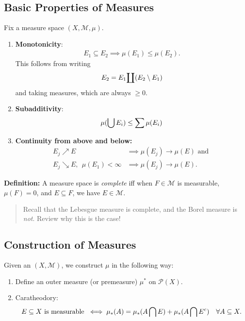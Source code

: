 \hypertarget{basic-properties-of-measures}{%
\subsection{Basic Properties of
Measures}\label{basic-properties-of-measures}}

Fix a measure space \((X, \mathcal M, \mu)\).

\begin{enumerate}
\def\labelenumi{\arabic{enumi}.}
\item
  \textbf{Monotonicity}:
  \begin{align*}
  E_1 \subseteq E_2 \implies \mu(E_1) \leq \mu(E_2)
  .\end{align*} This follows from writing
  \begin{align*}
    E_2 = E_1 {\coprod} (E_2 \setminus E_1)
    \end{align*} and taking measures, which are always \(\geq 0\).
\item
  \textbf{Subadditivity}:
  \begin{align*}
  \mu(\bigcup E_i) \leq \sum \mu(E_i)
  \end{align*}
\item
  \textbf{Continuity from above and below:} \begin{align*}
  E_j \nearrow E &\implies \mu(E_j) \to \mu(E) \text{ and }  \\ E_j \searrow E, ~~\mu(E_1) < \infty &\implies \mu(E_j) \to \mu(E)
  .\end{align*}
\end{enumerate}

\textbf{Definition:} A measure space is \emph{complete} iff when
\(F \in \mathcal M\) is measurable, \(\mu(F) = 0\), and
\(E\subseteq F\), we have \(E \in \mathcal M\).

\begin{quote}
Recall that the Lebesgue measure is complete, and the Borel measure is
\emph{not}. Review why this is the case!
\end{quote}

\hypertarget{construction-of-measures}{%
\subsection{Construction of Measures}\label{construction-of-measures}}

Given an \((X, \mathcal M)\), we construct \(\mu\) in the following way:

\begin{enumerate}
\def\labelenumi{\arabic{enumi}.}
\tightlist
\item
  Define an outer measure (or premeasure) \(\mu^*\) on
  \(\mathcal P(X)\).
\item
  Caratheodory:
  \begin{align*}
  E\subseteq X \text{ is measurable } \iff \mu_*(A) = \mu_*(A\bigcap E) + \mu_*(A\bigcap E^c) \quad \forall A \subseteq X
  .\end{align*}
\end{enumerate}

